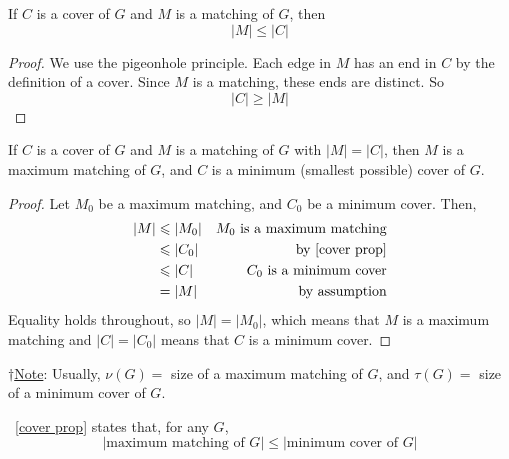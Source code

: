 \begin{thmbox}
    \begin{prop}\label{cover prop}
        If $ C $ is a cover of $ G $ and $ M $ is a matching of $ G $, then
        \[ |M|\leqslant |C| \]
    \end{prop}
\end{thmbox}
\begin{proof}
    We use the pigeonhole principle. Each edge in $ M $ has an end in $ C $ by the definition
    of a cover. Since $ M $ is a matching, these ends are distinct. So
    \[ |C|\geqslant |M| \]
\end{proof}

\begin{thmbox}
    \begin{prop}\label{equality cover}
        If $ C $ is a cover of $ G $ and $ M $ is a matching of $ G $ with $ |M|=|C| $,
        then $ M $ is a maximum matching of $ G $, and $ C $ is a minimum (smallest possible)
        cover of $ G $.
    \end{prop}
\end{thmbox}
\begin{proof}
    Let $ M_0 $ be a maximum matching, and $ C_0 $ be a minimum cover. Then,
    \begin{equation}
        \begin{aligned}
            |M| & \leqslant |M_0| & M_0\text{ is a maximum matching} \\
                & \leqslant |C_0| & \text{by~\ref{cover prop}}       \\
                & \leqslant |C|   & C_0 \text{ is a minimum cover}   \\
                & =|M|            & \text{by assumption}
        \end{aligned}
    \end{equation}
    Equality holds throughout, so $ |M|=|M_0| $, which means that $ M $ is a maximum
    matching and $ |C|=|C_0| $ means that $ C $ is a minimum cover.
\end{proof}
$ \dagger $\underline{Note}: Usually, $ \nu(G) = $ size of a maximum matching of $ G $,
and $ \tau(G) = $ size of a minimum cover of $ G $.

~\ref{cover prop} states that, for any $ G $,
\[ |\text{maximum matching of }G|\leqslant |\text{minimum cover of }G| \]


